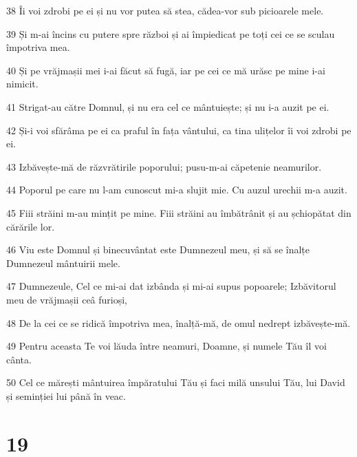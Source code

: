 \par 38 Îi voi zdrobi pe ei și nu vor putea să stea, cădea-vor sub picioarele mele.
\par 39 Și m-ai încins cu putere spre război și ai împiedicat pe toți cei ce se sculau împotriva mea.
\par 40 Și pe vrăjmașii mei i-ai făcut să fugă, iar pe cei ce mă urăsc pe mine i-ai nimicit.
\par 41 Strigat-au către Domnul, și nu era cel ce mântuiește; și nu i-a auzit pe ei.
\par 42 Și-i voi sfărâma pe ei ca praful în fața vântului, ca tina ulițelor îi voi zdrobi pe ei.
\par 43 Izbăvește-mă de răzvrătirile poporului; pusu-m-ai căpetenie neamurilor.
\par 44 Poporul pe care nu l-am cunoscut mi-a slujit mie. Cu auzul urechii m-a auzit.
\par 45 Fiii străini m-au mințit pe mine. Fiii străini au îmbătrânit și au șchiopătat din cărările lor.
\par 46 Viu este Domnul și binecuvântat este Dumnezeul meu, și să se înalțe Dumnezeul mântuirii mele.
\par 47 Dumnezeule, Cel ce mi-ai dat izbânda și mi-ai supus popoarele; Izbăvitorul meu de vrăjmașii ceâ furioși,
\par 48 De la cei ce se ridică împotriva mea, înalță-mă, de omul nedrept izbăvește-mă.
\par 49 Pentru aceasta Te voi lăuda între neamuri, Doamne, și numele Tău îl voi cânta.
\par 50 Cel ce mărești mântuirea împăratului Tău și faci milă unsului Tău, lui David și seminției lui până în veac.

\chapter{19}

